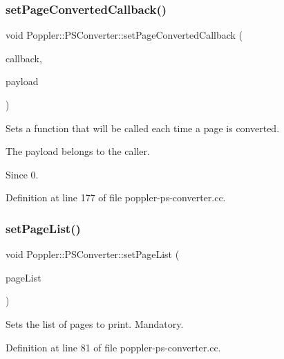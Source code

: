 \subsubsection{\texorpdfstring{set\+Page\+Converted\+Callback()}{setPageConvertedCallback()}}
{\footnotesize\ttfamily void Poppler\+::\+P\+S\+Converter\+::set\+Page\+Converted\+Callback (\begin{DoxyParamCaption}\item[{void($\ast$)(int page, void $\ast$payload)}]{callback,  }\item[{void $\ast$}]{payload }\end{DoxyParamCaption})}

Sets a function that will be called each time a page is converted.

The payload belongs to the caller.

\begin{DoxySince}{Since}
0. 
\end{DoxySince}


Definition at line 177 of file poppler-\/ps-\/converter.\+cc.

\mbox{\label{class_poppler_1_1_p_s_converter_ab1b834475ed943018c56843cfede95b7}} 
\subsubsection{\texorpdfstring{set\+Page\+List()}{setPageList()}}
{\footnotesize\ttfamily void Poppler\+::\+P\+S\+Converter\+::set\+Page\+List (\begin{DoxyParamCaption}\item[{const Q\+List$<$ int $>$ \&}]{page\+List }\end{DoxyParamCaption})}

Sets the list of pages to print. Mandatory. 

Definition at line 81 of file poppler-\/ps-\/converter.\+cc.

\mbox{\label{class_poppler_1_1_p_s_converter_aa06d1f5965ba68bd7ee5b90828fd515f}} 
